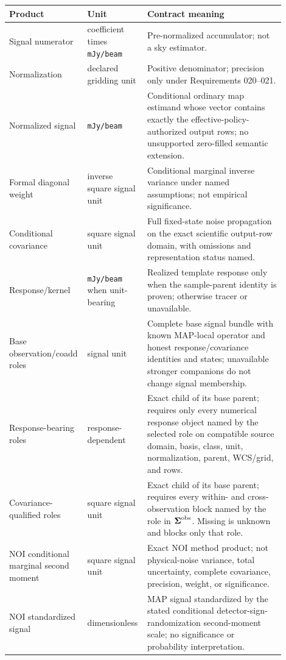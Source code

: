 \documentclass[10pt]{article}
\newcommand{\code}[1]{\nolinkurl{#1}}
\begin{document}
\begin{longtable}{L{0.23\linewidth}L{0.18\linewidth}L{0.49\linewidth}}
\toprule
Product & Unit & Contract meaning\\
\midrule
Signal numerator & coefficient times \code{mJy/beam} & Pre-normalized
accumulator; not a sky estimator.\\
Normalization & declared gridding unit & Positive denominator; precision only
under Requirements 020--021.\\
Normalized signal & \code{mJy/beam} & Conditional ordinary map estimand whose
vector contains exactly the effective-policy-authorized output rows; no
unsupported zero-filled semantic extension.\\
Formal diagonal weight & inverse square signal unit & Conditional marginal
inverse variance under named assumptions; not empirical significance.\\
Conditional covariance & square signal unit & Full fixed-state noise
propagation on the exact scientific output-row domain, with omissions and
representation status named.\\
Response/kernel & \code{mJy/beam} when unit-bearing & Realized template response
only when the sample-parent identity is proven; otherwise tracer or unavailable.\\
Base observation/coadd roles & signal unit & Complete base signal bundle with
known MAP-local operator and honest response/covariance identities and states;
unavailable stronger companions do not change signal membership.\\
Response-bearing roles & response-dependent & Exact child of its base parent;
requires only every numerical response object named by the selected role on
compatible source domain, basis, class, unit, normalization, parent, WCS/grid,
and rows.\\
Covariance-qualified roles & square signal unit & Exact child of its base
parent; requires every within- and cross-observation block named by the role in
\(\boldsymbol\Sigma^{\rm obs}\). Missing is unknown and blocks only that role.\\
NOI conditional marginal second moment & square signal unit & Exact NOI method
product; not physical-noise variance, total uncertainty, complete covariance,
precision, weight, or significance.\\
NOI standardized signal & dimensionless & MAP signal standardized by the
stated conditional detector-sign-randomization second-moment scale; no
significance or probability interpretation.\\

\end{longtable}
\end{document}
